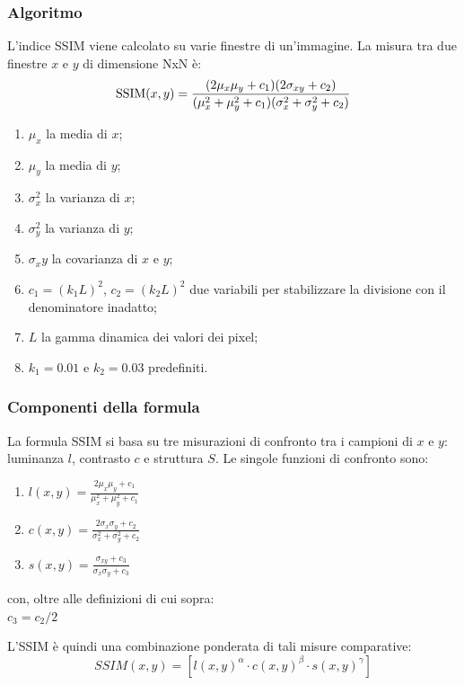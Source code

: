 \documentclass[a4paper,11pt]{article}
\begin{document}
    \subsubsection{Algoritmo}
    L'indice SSIM viene calcolato su varie finestre di un'immagine. La misura tra due finestre $x$ e $y$ di dimensione NxN è: \\[0.2in]
        $$\hbox{SSIM}(x,y) = \frac{(2\mu_x\mu_y + c_1)(2\sigma_{xy} + c_2)}{(\mu_x^2 + \mu_y^2 + c_1)(\sigma_x^2 + \sigma_y^2 + c_2)}$$
    \begin{enumerate} 
        \item $\mu_x$ la media di $x$;
        \item $\mu_y$ la media di $y$;
        \item $\sigma_x^2$ la varianza di $x$;
        \item $\sigma_y^2$ la varianza di $y$;
        \item $\sigma_xy$ la covarianza di $x$ e $y$;
        \item $c_1=(k_1L)^2$, $c_2=(k_2L)^2$ due variabili per stabilizzare la divisione con il denominatore inadatto;
        \item $L$ la gamma dinamica dei valori dei pixel;
        \item $k_1=0.01$ e $k_2=0.03$ predefiniti.
   \end{enumerate}

   \newpage

    \subsubsection{Componenti della formula}
    La formula SSIM si basa su tre misurazioni di confronto tra i campioni di $x$ e $y$: luminanza $l$, contrasto $c$ e struttura $S$. Le singole funzioni di confronto sono:
    \begin{enumerate} 
        \item $l(x,y)=\frac{2\mu_x\mu_y + c_1}{\mu^2_x + \mu^2_y + c_1}$
        \item $c(x,y)=\frac{2\sigma_x\sigma_y + c_2}{\sigma^2_x + \sigma^2_y + c_2}$
        \item $s(x,y)=\frac{\sigma_{xy} + c_3}{\sigma_x \sigma_y + c_3}$
    \end{enumerate}
    con, oltre alle definizioni di cui sopra:\\
    $c_3 = c_2 / 2$ 

    L'SSIM è quindi una combinazione ponderata di tali misure comparative:
    $$SSIM(x,y) = [l(x,y)^\alpha \cdot c(x,y)^\beta \cdot s(x,y)^\gamma]$$
    
\end{document}
